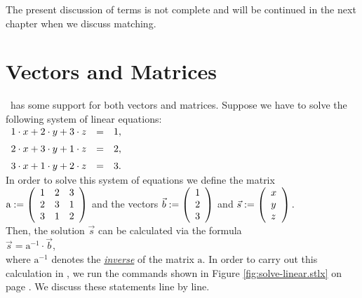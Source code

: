 The present discussion of terms is not complete and will be continued in the next chapter when we
discuss matching.

\section{Vectors and Matrices}
\setlx\ has some support for both vectors and matrices.  Suppose we have to solve the following system
of linear equations:
\\[0.2cm]
\hspace*{1.3cm}
$\begin{array}[c]{lcl}
    1 \cdot x + 2 \cdot y + 3 \cdot z & = & 1, \\[0.2cm]
    2 \cdot x + 3 \cdot y + 1 \cdot z & = & 2, \\[0.2cm]
    3 \cdot x + 1 \cdot y + 2 \cdot z & = & 3.          
  \end{array}
$
\\[0.2cm]
In order to solve this system of equations we define the matrix
\\[0.2cm]
\hspace*{1.3cm}
$\mathrm{a} := \left(
  \begin{array}[c]{lll}
    1 & 2 & 3     \\
    2 & 3 & 1     \\
    3 & 1 & 2            
  \end{array}\right)
$ \qquad and the vectors \qquad
$\vec{b} := \left(
  \begin{array}[c]{l}
    1 \\
    2 \\
    3        
  \end{array}\right)
$
\quad and \quad
$\vec{s} := \left(
  \begin{array}[c]{l}
    x \\
    y \\
    z        
  \end{array}\right).
$ 
\\[0.2cm]
Then, the solution $\vec{s}$ can be calculated via the formula
\\[0.2cm]
\hspace*{1.3cm}
$\vec{s} = \mathrm{a}^{-1} \cdot \vec{b}$,
\\[0.2cm]
where $\mathrm{a}^{-1}$ denotes the \href{http://en.wikipedia.org/wiki/Invertible_matrix}{\emph{inverse}} of
the matrix $\mathrm{a}$.  In order to carry out this calculation in 
\setlx, we run the commands shown in Figure \ref{fig:solve-linear.stlx} on page
\pageref{fig:solve-linear.stlx}.  We discuss these statements line by line.

